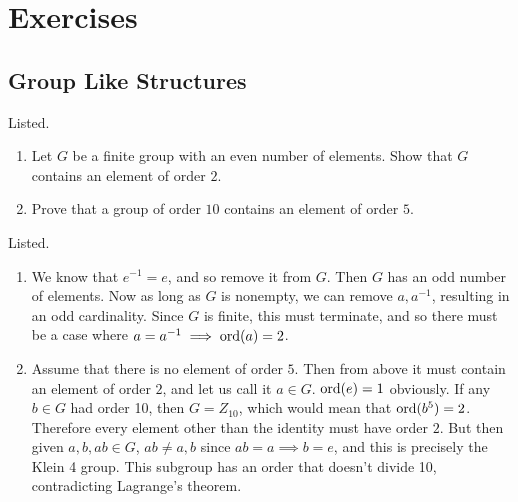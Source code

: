 \section{Exercises} 

\subsection{Group Like Structures}

  \begin{exercise}
    Listed. 
    \begin{enumerate}
      \item Let $G$ be a finite group with an even number of elements. Show that $G$ contains an element of order $2$. 
      \item Prove that a group of order $10$ contains an element of order $5$. 
    \end{enumerate}
  \end{exercise}
  \begin{solution}
    Listed. 
    \begin{enumerate}
      \item We know that $e^{-1} = e$, and so remove it from $G$. Then $G$ has an odd number of elements. Now as long as $G$ is nonempty, we can remove $a, a^{-1}$, resulting in an odd cardinality. Since $G$ is finite, this must terminate, and so there must be a case where $a = a^{-1} \implies \operatorname{ord}(a) = 2$. 
      \item Assume that there is no element of order $5$. Then from above it must contain an element of order $2$, and let us call it $a \in G$. $\operatorname{ord}(e) = 1$ obviously. If any $b \in G$ had order 10, then $G = Z_{10}$, which would mean that $\operatorname{ord}(b^5) = 2$. Therefore every element other than the identity must have order $2$. But then given $a, b, ab \in G$, $ab \neq a, b$ since $ab = a \implies b = e$, and this is precisely the Klein 4 group. This subgroup has an order that doesn't divide 10, contradicting Lagrange's theorem. 
    \end{enumerate}
  \end{solution}

